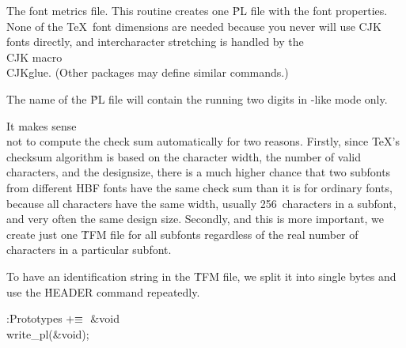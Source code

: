 The font metrics file.
This routine creates one \.{PL} file with the font properties. None of the
\TeX\ font dimensions are needed because you never will use CJK fonts
directly, and intercharacter stretching is handled by the \\{CJK} macro
\.{\\CJKglue}. (Other packages may define similar commands.)

The name of the \.{PL} file will contain the running two digits in
\mf-like mode only.

It makes sense \\{not} to compute the check sum automatically for two
reasons. Firstly, since \TeX's checksum algorithm is based on the character
width, the number of valid characters, and the designsize, there is a much
higher chance that two subfonts from different HBF fonts have the same check
sum than it is for ordinary fonts, because all characters have the same
width, usually 256~characters in a subfont, and very often the same design
size. Secondly, and this is more important, we create just one
\.{TFM} file for all subfonts regardless of the real number of characters
in a particular subfont.

To have an identification string in the \.{TFM} file, we split it into
single bytes and use the \.{HEADER} command repeatedly.

\Y\B\4:Prototypes\X${}\mathrel+\equiv{}$\6
\&{void} \\{write\_pl}(\&{void});\par
\fi


